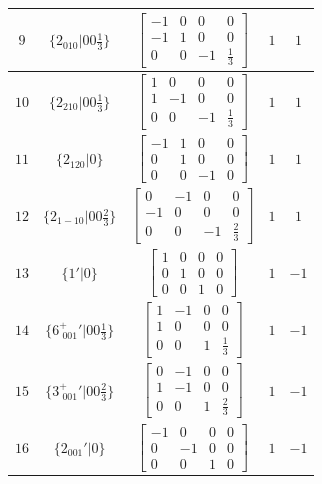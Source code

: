 \documentclass[fleqn,8pt]{jsarticle}
\begin{document}
\begin{longtable}{ccccc}
$ 9 $ & $ \{2{}_{010}|0 0 \frac{1}{3}\} $ & $ \begin{bmatrix} -1 & 0 & 0 & 0 \\ -1 & 1 & 0 & 0 \\ 0 & 0 & -1 & \frac{1}{3} \end{bmatrix} $ & $ 1 $ & $ 1 $ \\ \hline
$ 10 $ & $ \{2{}_{210}|0 0 \frac{1}{3}\} $ & $ \begin{bmatrix} 1 & 0 & 0 & 0 \\ 1 & -1 & 0 & 0 \\ 0 & 0 & -1 & \frac{1}{3} \end{bmatrix} $ & $ 1 $ & $ 1 $ \\ \hline
$ 11 $ & $ \{2{}_{120}|0\} $ & $ \begin{bmatrix} -1 & 1 & 0 & 0 \\ 0 & 1 & 0 & 0 \\ 0 & 0 & -1 & 0 \end{bmatrix} $ & $ 1 $ & $ 1 $ \\ \hline
$ 12 $ & $ \{2{}_{1-10}|0 0 \frac{2}{3}\} $ & $ \begin{bmatrix} 0 & -1 & 0 & 0 \\ -1 & 0 & 0 & 0 \\ 0 & 0 & -1 & \frac{2}{3} \end{bmatrix} $ & $ 1 $ & $ 1 $ \\ \hline
$ 13 $ & $ \{1{}'|0\} $ & $ \begin{bmatrix} 1 & 0 & 0 & 0 \\ 0 & 1 & 0 & 0 \\ 0 & 0 & 1 & 0 \end{bmatrix} $ & $ 1 $ & $ -1 $ \\ \hline
$ 14 $ & $ \{6^{+}_{\,\,001}{}'|0 0 \frac{1}{3}\} $ & $ \begin{bmatrix} 1 & -1 & 0 & 0 \\ 1 & 0 & 0 & 0 \\ 0 & 0 & 1 & \frac{1}{3} \end{bmatrix} $ & $ 1 $ & $ -1 $ \\ \hline
$ 15 $ & $ \{3^{+}_{\,\,001}{}'|0 0 \frac{2}{3}\} $ & $ \begin{bmatrix} 0 & -1 & 0 & 0 \\ 1 & -1 & 0 & 0 \\ 0 & 0 & 1 & \frac{2}{3} \end{bmatrix} $ & $ 1 $ & $ -1 $ \\ \hline
$ 16 $ & $ \{2{}_{001}{}'|0\} $ & $ \begin{bmatrix} -1 & 0 & 0 & 0 \\ 0 & -1 & 0 & 0 \\ 0 & 0 & 1 & 0 \end{bmatrix} $ & $ 1 $ & $ -1 $ \\ \hline

\end{longtable}
\end{document}

